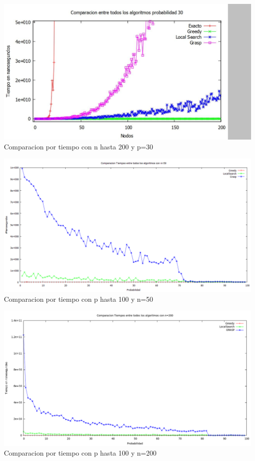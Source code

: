 \begin{center}
\includegraphics[width=17cm]{./graficos/comparaciontiemponvariablep30.png}\\
Comparacion por tiempo con n hasta 200 y p=30
\end{center}



\begin{center}
\includegraphics[width=17cm]{./graficos/comparaciontiemposprobvariablen50.png}\\
Comparacion por tiempo con p hasta 100 y n=50
\end{center}


\begin{center}
\includegraphics[width=17cm]{./graficos/comparaciontiemposprobvariablen200.png}\\
Comparacion por tiempo con p hasta 100 y n=200
\end{center}

